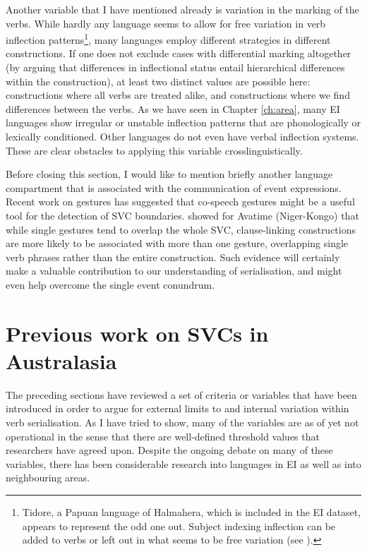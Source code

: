 Another variable that I have mentioned already is variation in the marking of the verbs. While hardly any language seems to allow for free variation in verb inflection patterns\footnote{Tidore, a Papuan language of Halmahera, which is included in the EI dataset, appears to represent the odd one out. Subject indexing inflection can be added to verbs or left out in what seems to be free variation (see \citealt{vanstaden2000tidore}).}, many languages employ different strategies in different constructions. If one does not exclude cases with differential marking altogether (by arguing that differences in inflectional status entail hierarchical differences within the construction), at least two distinct values are possible here: constructions where all verbs are treated alike, and constructions where we find differences between the verbs. As we have seen in  Chapter \ref{ch:area}, many EI languages show irregular or unstable inflection patterns that are phonologically or lexically conditioned. Other languages do not even have verbal inflection systems. These are clear obstacles to applying this variable crosslinguistically.

Before closing this section, I would like to mention briefly another language compartment that is associated with the communication of event expressions. Recent work on gestures has suggested that co-speech gestures might be a useful tool for the detection of SVC boundaries. \citet{defina2016serial} showed for Avatime (Niger-Kongo) that while single gestures tend to overlap the whole SVC, clause-linking constructions are more likely to be associated with more than one gesture, overlapping single verb phrases rather than the entire construction. Such evidence will certainly make a valuable contribution to our understanding of serialisation, and might even help overcome the single event conundrum.

\section{Previous work on SVCs in Australasia} \label{previouswork}

The preceding sections have reviewed a set of criteria or variables that have been introduced in order to argue for external limits to and internal variation within verb serialisation. As I have tried to show, many of the variables are as of yet not operational in the sense that there are well-defined threshold values that researchers have agreed upon. Despite the ongoing debate on many of these variables, there has been considerable research into languages in EI as well as into neighbouring areas. 

